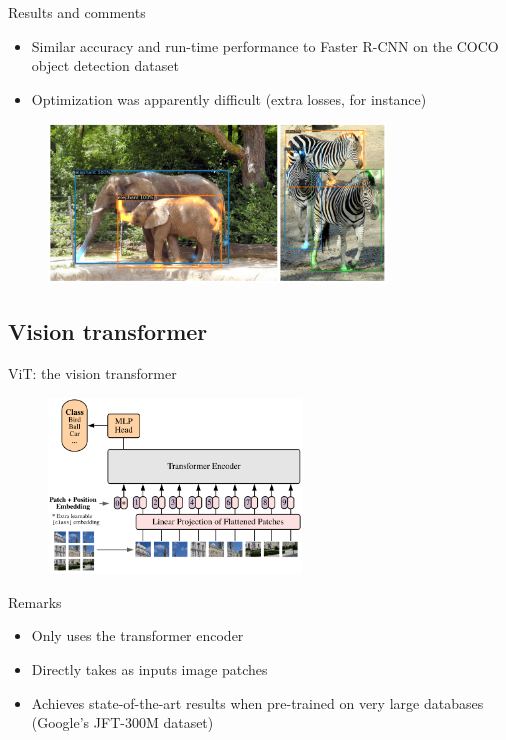 \documentclass[xcolor=pdftex,dvipsnames,table,mathserif]{beamer}
\begin{document}
\begin{frame}{Results and comments}

\begin{itemize}
\item Similar accuracy and run-time performance to Faster R-CNN on the COCO object detection dataset
\item Optimization was apparently difficult (extra losses, for instance)
\end{itemize}

\begin{figure}[ht]
  \centering
  \includegraphics[width=0.8\textwidth]{detr_attention_scores}
\end{figure}


\end{frame}

\subsection{Vision transformer}


\begin{frame}{ViT: the vision transformer~\cite{dosovitskiy_image_2021}}

\begin{figure}[ht]
  \centering
  \includegraphics[width=0.6\textwidth]{vision_transformer}
\end{figure}

\begin{block}{Remarks}
  \begin{itemize}
  \item Only uses the transformer encoder
  \item Directly takes as inputs image patches
  \item Achieves state-of-the-art results when pre-trained on very large databases (Google's JFT-300M dataset)
  \end{itemize}
\end{block}


\end{frame}
\end{document}
